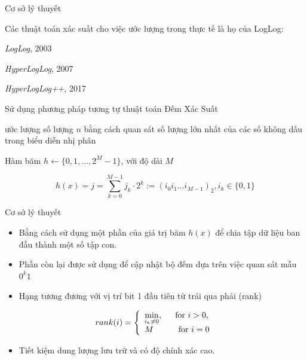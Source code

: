 \documentclass[10pt]{beamer}
\newcommand{\SubItem}[1]{
    {\setlength\itemindent{15pt} \item[-] #1}
}
\begin{document}
\begin{frame}[fragile]{Cơ sở lý thuyết}
\begin{itemize}
  \item Các thuật toán xác suất cho việc ước lượng trong thực tế là họ của LogLog:
  \SubItem{\textit{LogLog}, 2003}
  \SubItem{\textit{HyperLogLog}, 2007}
  \SubItem{\textit{HyperLogLog++}, 2017}
  \item Sử dụng phương pháp tương tự thuật toán Đếm Xác Suất
  \SubItem{ước lượng số lượng $n$ bằng cách quan sát số lượng lớn nhất của các số không dấu
  trong biểu diễn nhị phân}
  \SubItem{Hàm băm $h \gets \{0,1,...,2^M-1\}$, với độ dài $M$}
\end{itemize}
\[
    h(x) = j = \sum\limits_{k=0}^{M-1}j_k\cdot2^k := \left(i_0i_1...i_{M-1}\right)_2,i_k \in \{0,1\}
\]
\end{frame}
\begin{frame}[fragile]{Cơ sở lý thuyết}
  \begin{itemize}
    \item Bằng cách sử dụng một phần của giá trị băm $h(x)$ để chia tập dữ liệu ban
    đầu thành một số tập con.
    \item Phần còn lại được sử dụng để cập nhật bộ đếm dựa trên việc quan sát mẫu $0^k1$
    \item Hạng tương đương với vị trí bit 1 đầu tiên từ trái qua phải (rank)
  \end{itemize}

\[
    rank(i)=\left\{
                \begin{array}{ll}
                    \min\limits_{i_k\neq 0}, \indent\text{for } i > 0,\\
                    M\indent\indent\text{for } i = 0
                \end{array}
            \right.
\]

\begin{itemize}
  \item Tiết kiệm dung lượng lưu trữ và có độ chính xác cao.
\end{itemize}
\end{frame}
\end{document}
